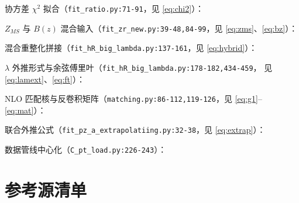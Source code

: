 \documentclass[UTF8]{ctexart}
\begin{document}
协方差 $\chi^2$ 拟合（\texttt{fit\_ratio.py:71-91}，见 \eqref{eq:chi2}）：


$Z_{MS}$ 与 $B(z)$ 混合输入（\texttt{fit\_zr\_new.py:39-48,84-99}，见
\eqref{eq:zms}、\eqref{eq:bz}）：



混合重整化拼接（\texttt{fit\_hR\_big\_lambda.py:137-161}，见 \eqref{eq:hybrid}）：


$\lambda$ 外推形式与余弦傅里叶（\texttt{fit\_hR\_big\_lambda.py:178-182,434-459}，
见 \eqref{eq:lamext}、\eqref{eq:ft}）：



NLO 匹配核与反卷积矩阵（\texttt{matching.py:86-112,119-126}，见
\eqref{eq:g1}--\eqref{eq:mat}）：



联合外推公式（\texttt{fit\_pz\_a\_extrapolatiing.py:32-38}，见 \eqref{eq:extrap}）：


数据管线中心化（\texttt{C\_pt\_load.py:226-243}）：


\section{参考源清单}
\end{document}
